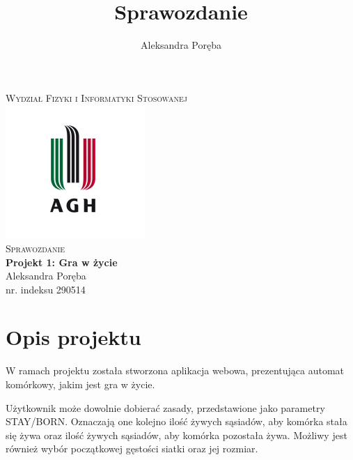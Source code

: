 \documentclass[12pt]{article}
\title{Sprawozdanie}
\author{Aleksandra Poręba}
\makeatletter
\let\thetitle\@title
\let\theauthor\@author
\makeatother
\begin{document}
\begin{center}
\textsc{\normalsize Wydział Fizyki i Informatyki Stosowanej}\\[2.0cm] 
\includegraphics[scale = 1]{logo.png}\\[1cm] 


\textsc{\Large Sprawozdanie}\\[0.4cm]
{ \huge \bfseries \LARGE{Projekt 1: Gra w życie} }\\[1cm] 

\flushright \Large Aleksandra Poręba \\ nr. indeksu 290514

\vfill 

\center{\today}


\pagebreak 

\end{center}

\tableofcontents
\pagebreak


\pagestyle{fancy}
\fancyhf{}

\rhead{\theauthor}
\lhead{\thetitle}
\cfoot{\thepage}

\section{Opis projektu}
W ramach projektu została stworzona aplikacja webowa, prezentująca automat komórkowy, jakim jest gra w życie.



Użytkownik może dowolnie dobierać zasady, przedstawione jako parametry STAY/BORN. Oznaczają one kolejno ilość żywych sąsiadów, aby komórka stała się żywa oraz ilość żywych sąsiadów, aby komórka pozostała żywa. Możliwy jest również wybór początkowej gęstości siatki oraz jej rozmiar.
\end{document}
